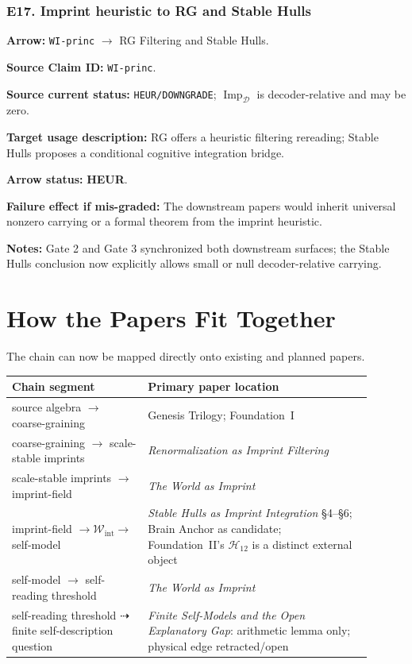 \documentclass[12pt,a4paper]{article}
\begin{document}
\subsubsection*{E17. Imprint heuristic to RG and Stable Hulls}
\noindent\textbf{Arrow:} \texttt{WI-princ}
\(\to\) RG Filtering and Stable Hulls.\par
\noindent\textbf{Source Claim ID:} \texttt{WI-princ}.\par
\noindent\textbf{Source current status:} \texttt{HEUR/DOWNGRADE};
\(\operatorname{Imp}_{\mathcal D}\) is decoder-relative and may be zero.\par
\noindent\textbf{Target usage description:} RG offers a heuristic
filtering rereading; Stable Hulls proposes a conditional cognitive
integration bridge.\par
\noindent\textbf{Arrow status:} \textbf{HEUR}.\par
\noindent\textbf{Failure effect if mis-graded:} The downstream papers
would inherit universal nonzero carrying or a formal theorem from the
imprint heuristic.\par
\noindent\textbf{Notes:} Gate 2 and Gate 3 synchronized both downstream
surfaces; the Stable Hulls conclusion now explicitly allows small or null
decoder-relative carrying.\par

\section{How the Papers Fit Together}

The chain can now be mapped directly onto existing and planned papers.

\begin{center}
\begin{tabular}{P{0.34\linewidth}P{0.56\linewidth}}
\toprule
\textbf{Chain segment} & \textbf{Primary paper location} \\
\midrule
source algebra $\to$ coarse-graining & Genesis Trilogy; Foundation~I \\
coarse-graining $\to$ scale-stable imprints & \emph{Renormalization as Imprint Filtering} \\
scale-stable imprints $\to$ imprint-field & \emph{The World as Imprint} \\
imprint-field $\to\mathcal W_{\mathrm{int}}\to$ self-model & \emph{Stable Hulls as Imprint Integration} \S4--\S6; Brain Anchor as candidate; Foundation~II's \(\mathcal H_{12}\) is a distinct external object \\
self-model $\to$ self-reading threshold & \emph{The World as Imprint} \\
self-reading threshold $\dashrightarrow$ finite self-description question & \emph{Finite Self-Models and the Open Explanatory Gap}: arithmetic lemma only; physical edge retracted/open \\
\bottomrule
\end{tabular}
\end{center}
\end{document}
